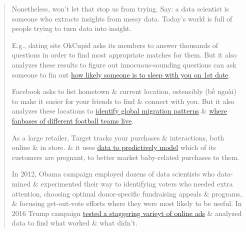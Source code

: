 \documentclass{article}
\begin{document}
\begin{itemize}
\begin{quote}
\begin{itemize}
			Nonetheless, won't let that stop us from trying. Say: a data scientist is someone who extracts insights from messy data. Today's world is full of people trying to turn data into insight.
			
			E.g., dating site OkCupid asks its members to answer thousands of questions in order to find most appropriate matches for them. But it also analyzes these results to figure out innocuous-sounding questions can ask someone to fin out \href{https://theblog.okcupid.com/the-best-questions-for-a-first-date-dba6adaa9df2}{how likely someone is to sleep with you on 1st date}.
			
			Facebook asks to list hometown \& current location, ostensibly (bề ngoài) to make it easier for your friends to find \& connect with you. But it also analyzes these locations to \href{https://www.facebook.com/notes/facebook-data-science/coordinated-migration/10151930946453859}{identify global migration patterns} \& \href{https://www.facebook.com/notes/facebook-data-science/nfl-fans-on-facebook/10151298370823859}{where fanbases of different football teams live}.
			
			As a large retailer, Target tracks your purchases \& interactions, both online \& in store. \& it uses \href{https://www.nytimes.com/2012/02/19/magazine/shopping-habits.html}{data to predictively model} which of its customers are pregnant, to better market baby-related purchases to them.
			
			In 2012, Obama campaign employed dozens of data scientists who data-mined \& experimented their way to identifying voters who needed extra attention, choosing optimal donor-specific fundraising appeals \& programs, \& focusing get-out-vote efforts where they were most likely to be useful. In 2016 Trump campaign \href{https://www.wired.com/2016/11/facebook-won-trump-election-not-just-fake-news/}{tested a staggering varieyt of online ads} \& analyzed data to find what worked \& what didn't.
			

\end{itemize}
\end{quote}
\end{itemize}
\end{document}
